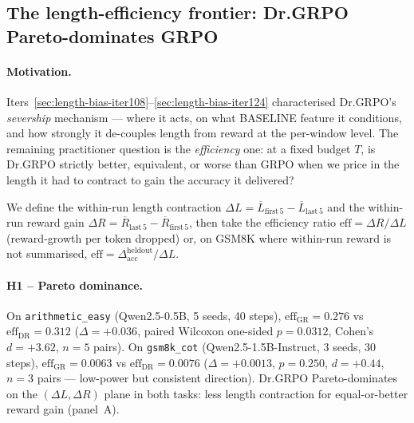 %

\subsection{The length-efficiency frontier: Dr.GRPO Pareto-dominates GRPO}
\label{sec:length-bias-iter128}

\paragraph{Motivation.}
Iters~\ref{sec:length-bias-iter108}--\ref{sec:length-bias-iter124}
characterised Dr.GRPO's \emph{severship} mechanism --- where it
acts, on what BASELINE feature it conditions, and how strongly it
de-couples length from reward at the per-window level.  The remaining
practitioner question is the \emph{efficiency} one: at a fixed
budget $T$, is Dr.GRPO strictly better, equivalent, or worse than
GRPO when we price in the length it had to contract to gain the
accuracy it delivered?

We define the within-run length contraction
$\Delta L = \overline{L}_{\mathrm{first}\,5} - \overline{L}_{\mathrm{last}\,5}$
and the within-run reward gain
$\Delta R = \overline{R}_{\mathrm{last}\,5} - \overline{R}_{\mathrm{first}\,5}$,
then take the efficiency ratio
$\mathrm{eff} = \Delta R / \Delta L$ (reward-growth per token dropped)
or, on GSM8K where within-run reward is not summarised,
$\mathrm{eff} = \Delta_{\mathrm{acc}}^{\mathrm{heldout}} / \Delta L$.

\paragraph{H1 -- Pareto dominance.}
On \texttt{arithmetic\_easy} (Qwen2.5-0.5B, 5 seeds, 40 steps),
$\mathrm{eff}_{\mathrm{GR}} = 0.276$ vs $\mathrm{eff}_{\mathrm{DR}} = 0.312$
($\Delta = +0.036$, paired Wilcoxon one-sided $p = 0.0312$,
Cohen's $d = +3.62$, $n{=}5$ pairs).
On \texttt{gsm8k\_cot} (Qwen2.5-1.5B-Instruct, 3 seeds, 30 steps),
$\mathrm{eff}_{\mathrm{GR}} = 0.0063$ vs $\mathrm{eff}_{\mathrm{DR}} = 0.0076$
($\Delta = +0.0013$, $p = 0.250$, $d = +0.44$, $n{=}3$ pairs ---
low-power but consistent direction).
Dr.GRPO Pareto-dominates on the $(\Delta L, \Delta R)$ plane in both
tasks: less length contraction for equal-or-better reward gain (panel~A).

